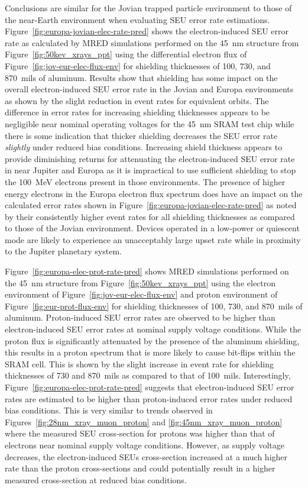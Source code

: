 Conclusions are similar for the Jovian trapped particle environment to those of the near-Earth environment when evaluating SEU error rate estimations.
Figure~\ref{fig:europa-jovian-elec-rate-pred} shows the electron-induced SEU error rate as calculated by MRED simulations performed on the 45~nm structure from Figure~\ref{fig:50kev_xrays_ppt} using the differential electron flux of Figure~\ref{fig:jov-eur-elec-flux-env} for shielding thicknesses of 100, 730, and 870~mils of aluminum.
Results show that shielding has some impact on the overall electron-induced SEU error rate in the Jovian and Europa environments as shown by the slight reduction in event rates for equivalent orbits.
The difference in error rates for increasing shielding thicknesses appears to be negligible near nominal operating voltages for the 45~nm SRAM test chip while there is some indication that thicker shielding decreases the SEU error rate \emph{slightly} under reduced bias conditions.
Increasing shield thickness appears to provide diminishing returns for attenuating the electron-induced SEU error rate in near Jupiter and Europa as it is impractical to use sufficient shielding to stop the 100~MeV electrons present in those environments.
The presence of higher energy electrons in the Europa electron flux spectrum does have an impact on the calculated error rates shown in Figure~\ref{fig:europa-jovian-elec-rate-pred} as noted by their consistently higher event rates for all shielding thicknesses as compared to those of the Jovian environment.
Devices operated in a low-power or quiescent mode are likely to experience an unacceptably large upset rate while in proximity to the Jupiter planetary system.

Figure~\ref{fig:europa-elec-prot-rate-pred} shows MRED simulations performed on the 45~nm structure from Figure~\ref{fig:50kev_xrays_ppt} using the electron environment of Figure~\ref{fig:jov-eur-elec-flux-env} and proton environment of Figure~\ref{fig:eur-prot-flux-env} for shielding thicknesses of 100, 730, and 870~mils of aluminum.
Proton-induced SEU error rates are observed to be higher than electron-induced SEU error rates at nominal supply voltage conditions. 
While the proton flux is significantly attenuated by the presence of the aluminum shielding, this results in a proton spectrum that is more likely to cause bit-flips within the SRAM cell.
This is shown by the slight increase in event rate for shielding thicknesses of 730 and 870~mils as compared to that of 100~mils.
Interestingly, Figure~\ref{fig:europa-elec-prot-rate-pred} suggests that electron-induced SEU error rates are estimated to be higher than proton-induced error rates under reduced bias conditions.
This is very similar to trends observed in Figures~\ref{fig:28nm_xray_muon_proton} and \ref{fig:45nm_xray_muon_proton} where the measured SEU cross-section for protons was higher than that of electrons near nominal supply voltage conditions.
However, as supply voltage decreases, the electron-induced SEUs cross-section increased at a much higher rate than the proton cross-sections and could potentially result in a higher measured cross-section at reduced bias conditions.

